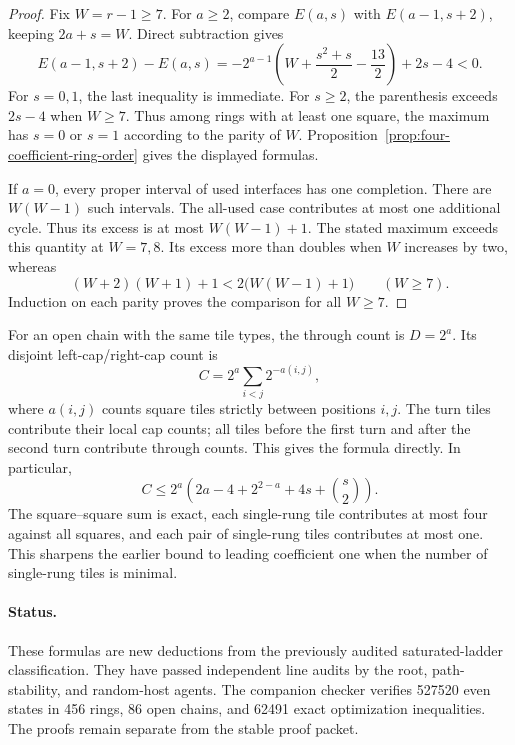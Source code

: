 \begin{proof}
Fix $W=r-1\ge7$.
For $a\ge2$, compare $E(a,s)$ with $E(a-1,s+2)$, keeping $2a+s=W$.
Direct subtraction gives
\[
 E(a-1,s+2)-E(a,s)
 =-2^{a-1}\left(W+\frac{s^2+s}{2}-\frac{13}{2}\right)+2s-4<0.
\]
For $s=0,1$, the last inequality is immediate.
For $s\ge2$, the parenthesis exceeds $2s-4$ when $W\ge7$.
Thus among rings with at least one square, the maximum has $s=0$ or $s=1$ according to the parity of $W$.
Proposition~\ref{prop:four-coefficient-ring-order} gives the displayed formulas.

If $a=0$, every proper interval of used interfaces has one completion.
There are $W(W-1)$ such intervals.
The all-used case contributes at most one additional cycle.
Thus its excess is at most $W(W-1)+1$.
The stated maximum exceeds this quantity at $W=7,8$.
Its excess more than doubles when $W$ increases by two, whereas
\[
 (W+2)(W+1)+1<2\bigl(W(W-1)+1\bigr)\qquad(W\ge7).
\]
Induction on each parity proves the comparison for all $W\ge7$.
\end{proof}

\begin{remark}
For an open chain with the same tile types, the through count is $D=2^a$.
Its disjoint left-cap/right-cap count is
\[
 C=2^a\sum_{i<j}2^{-a(i,j)},
\]
where $a(i,j)$ counts square tiles strictly between positions $i,j$.
The turn tiles contribute their local cap counts; all tiles before the first turn and after the second turn contribute through counts.
This gives the formula directly.
In particular,
\[
 C\le2^a\left(2a-4+2^{2-a}+4s+\binom s2\right).
\]
The square--square sum is exact, each single-rung tile contributes at most four against all squares, and each pair of single-rung tiles contributes at most one.
This sharpens the earlier bound to leading coefficient one when the number of single-rung tiles is minimal.
\end{remark}

\paragraph{Status.}
These formulas are new deductions from the previously audited saturated-ladder classification.
They have passed independent line audits by the root, path-stability, and random-host agents.
The companion checker verifies 527520 even states in 456 rings, 86 open chains, and 62491 exact optimization inequalities.
The proofs remain separate from the stable proof packet.
